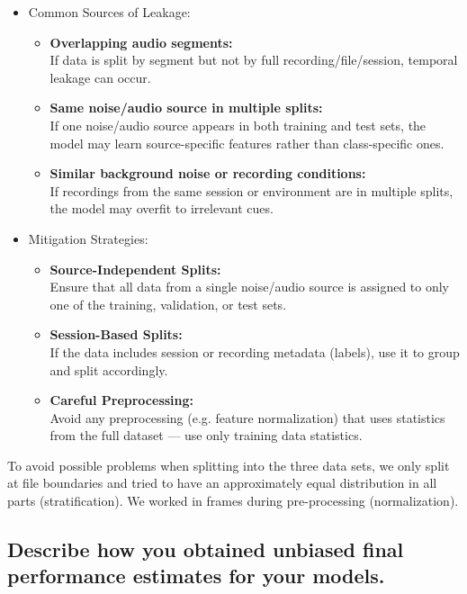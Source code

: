 \begin{itemize}
	\item Common Sources of Leakage:
	\begin{itemize}
		\item {\bf Overlapping audio segments:} \\
			If data is split by segment but not by full recording/file/session, temporal leakage can occur.
		\item {\bf Same noise/audio source in multiple splits:} \\
			If one noise/audio source appears in both training and test sets, the model may learn source-specific features rather than class-specific ones.
		\item {\bf Similar background noise or recording conditions:} \\
			If recordings from the same session or environment are in multiple splits, the model may overfit to irrelevant cues.
	\end{itemize}
	
	\item Mitigation Strategies:
	\begin{itemize}
		\item {\bf Source-Independent Splits:} \\
			Ensure that all data from a single noise/audio source is assigned to only one of the training, validation, or test sets.
		\item {\bf Session-Based Splits:} \\
			If the data includes session or recording metadata (labels), use it to group and split accordingly.
		\item {\bf Careful Preprocessing:} \\
			Avoid any preprocessing (e.g. feature normalization) that uses statistics from the full dataset — use only training data statistics.
	\end{itemize}
\end{itemize}


To avoid possible problems when splitting into the three data sets, 
we only split at file boundaries and tried to have an approximately equal distribution in all parts (stratification).
We worked in frames during pre-processing (normalization).




\subsection{Describe how you obtained unbiased final performance estimates for your models. }
\label{sec:Data Split:c}

